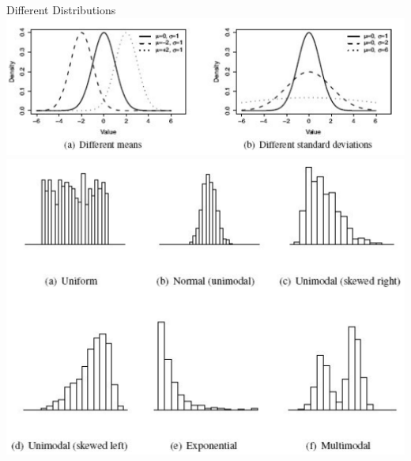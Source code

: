 \documentclass[aspectratio=169,xcolor=dvipsnames]{beamer}
\begin{document}
\begin{frame}{Different Distributions}
\centering
\includegraphics[scale=0.33]{images/diff_sds}
\includegraphics[scale=0.43]{images/diff_distributions}
\end{frame}
\end{document}
